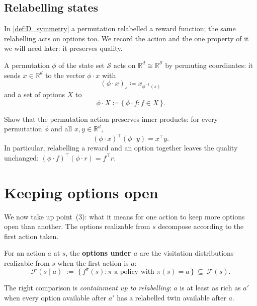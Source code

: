 \documentclass[11pt]{article}
\newcommand{\cS}{\mathcal{S}}
\newcommand{\R}{\mathbb{R}}
\newcommand{\F}{\mathcal{F}}       %
\begin{document}
\subsection*{Relabelling states}

In \cref{def:D_symmetry} a permutation relabelled a reward function; the same relabelling acts on
options too. We record the action and the one property of it we will need later: it preserves
quality.

\begin{definition}\label{def:perm_action}
A permutation $\phi$ of the state set $\cS$ acts on $\R^d \cong \R^{\cS}$ by permuting
coordinates: it sends $x \in \R^d$ to the vector $\phi \cdot x$ with
$$(\phi \cdot x)_{s} \coloneqq x_{\phi^{-1}(s)}$$
and a set of options $X$ to
$$\phi \cdot X \coloneqq \{\, \phi \cdot f : f \in X \,\}.$$
\end{definition}

\begin{exercise}
\label{prob:quality_invariant} Show that the permutation action preserves
inner products: for every permutation $\phi$ and all $x, y \in \R^d$,
$$
(\phi \cdot x)^\top (\phi \cdot y) = x^\top y .
$$
In particular, relabelling a reward and an option together leaves the quality unchanged:
$(\phi \cdot f)^\top (\phi \cdot r) = f^\top r$.
\end{exercise}



\section{Keeping options open}\label{prob:options}

We now take up point~(3): what it means for one action to keep more options open than another.
The options realizable from $s$ decompose according to the first action taken.

\begin{definition}\label{def:options_action}
For an action $a$ at $s$, the \textbf{options under $a$} are the visitation distributions
realizable from $s$ when the first action is $a$:
$$
\F(s \mid a) \;:=\; \bigl\{\, f^\pi(s) : \pi \text{ a policy with } \pi(s) = a \,\bigr\} \ \subseteq\ \F(s).
$$
\end{definition}

The right comparison is \emph{containment up to relabelling}: $a$ is at least as rich as $a'$
when every option available after $a'$ has a relabelled twin available after $a$.
\end{document}

